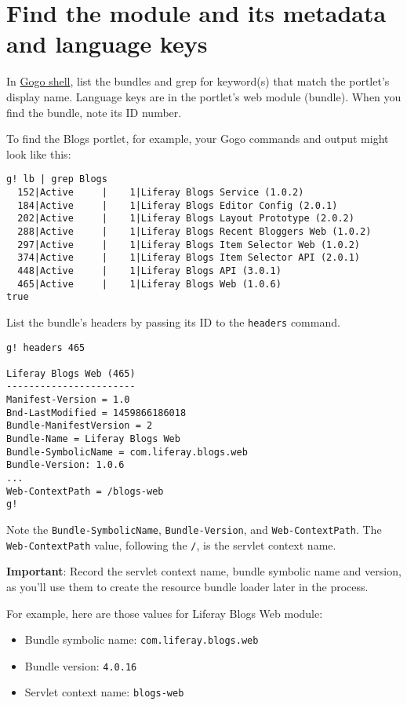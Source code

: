 \section{Find the module and its metadata and language
keys}\label{find-the-module-and-its-metadata-and-language-keys}

In
\href{/docs/7-2/customization/-/knowledge_base/c/using-the-felix-gogo-shell}{Gogo
shell}, list the bundles and grep for keyword(s) that match the
portlet's display name. Language keys are in the portlet's web module
(bundle). When you find the bundle, note its ID number.

To find the Blogs portlet, for example, your Gogo commands and output
might look like this:

\begin{verbatim}
g! lb | grep Blogs
  152|Active     |    1|Liferay Blogs Service (1.0.2)
  184|Active     |    1|Liferay Blogs Editor Config (2.0.1)
  202|Active     |    1|Liferay Blogs Layout Prototype (2.0.2)
  288|Active     |    1|Liferay Blogs Recent Bloggers Web (1.0.2)
  297|Active     |    1|Liferay Blogs Item Selector Web (1.0.2)
  374|Active     |    1|Liferay Blogs Item Selector API (2.0.1)
  448|Active     |    1|Liferay Blogs API (3.0.1)
  465|Active     |    1|Liferay Blogs Web (1.0.6)
true
\end{verbatim}

List the bundle's headers by passing its ID to the \texttt{headers}
command.

\begin{verbatim}
g! headers 465

Liferay Blogs Web (465)
-----------------------
Manifest-Version = 1.0
Bnd-LastModified = 1459866186018
Bundle-ManifestVersion = 2
Bundle-Name = Liferay Blogs Web
Bundle-SymbolicName = com.liferay.blogs.web
Bundle-Version: 1.0.6
... 
Web-ContextPath = /blogs-web
g! 
\end{verbatim}

Note the \texttt{Bundle-SymbolicName}, \texttt{Bundle-Version}, and
\texttt{Web-ContextPath}. The \texttt{Web-ContextPath} value, following
the \texttt{/}, is the servlet context name.

\textbf{Important}: Record the servlet context name, bundle symbolic
name and version, as you'll use them to create the resource bundle
loader later in the process.

For example, here are those values for Liferay Blogs Web module:

\begin{itemize}
\tightlist
\item
  Bundle symbolic name: \texttt{com.liferay.blogs.web}
\item
  Bundle version: \texttt{4.0.16}
\item
  Servlet context name: \texttt{blogs-web}
\end{itemize}

